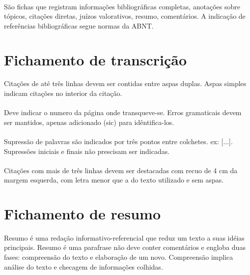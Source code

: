 \paragraph{}
São fichas que registram informações bibliográficas completas, anotações sobre tópicos, citações diretas, juízos valorativos, resumo, comentários. A indicação de referências bibliográficas segue normas da ABNT.

\section{Fichamento de transcrição}

\paragraph{}
Citações de até três linhas devem ser contidas entre aspas duplas. Aspas simples indicam citações no interior da citação.

\paragraph{}
Deve indicar o numero da página onde transqueve-se. Erros gramaticais devem ser mantidos, apenas adicionado (sic) para idêntifica-los.

\paragraph{}
Supressão de palavras são indicados por três pontos entre colchetes. ex: [...]. Supressões iniciais e finais não prescisam ser indicadas.

\paragraph{}
Citações com mais de três linhas devem ser destacadas com recuo de 4 cm da margem esquerda, com letra menor que a do texto utilizado e sem aspas.

\section{Fichamento de resumo}

\paragraph{}
Resumo é uma redação informativo-referencial que reduz um texto a suas idéias principais. Resumo é uma parafrase não deve conter comentários e engloba duas fases: compreensão do texto e elaboração de um novo. Compreensão implica análise do texto e checagem de informações colhidas.

